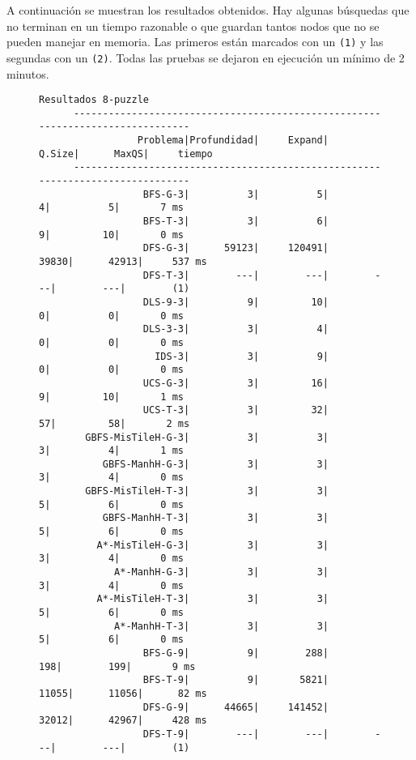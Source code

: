 \documentclass{article}
\begin{document}
A continuación se muestran los resultados obtenidos. Hay algunas búsquedas que no terminan en un tiempo razonable o que guardan tantos nodos que no se pueden manejar en memoria. Las primeros están marcados con un \texttt{(1)} y las segundas con un \texttt{(2)}. Todas las pruebas se dejaron en ejecución un mínimo de 2 minutos.
\newline
\begin{figure}[H]
\begin{Verbatim}[fontsize=\footnotesize]
      Resultados 8-puzzle
      -------------------------------------------------------------------------------
                 Problema|Profundidad|     Expand|     Q.Size|      MaxQS|     tiempo
      -------------------------------------------------------------------------------
                  BFS-G-3|          3|          5|          4|          5|       7 ms
                  BFS-T-3|          3|          6|          9|         10|       0 ms
                  DFS-G-3|      59123|     120491|      39830|      42913|     537 ms
                  DFS-T-3|        ---|        ---|        ---|        ---|        (1)
                  DLS-9-3|          9|         10|          0|          0|       0 ms
                  DLS-3-3|          3|          4|          0|          0|       0 ms
                    IDS-3|          3|          9|          0|          0|       0 ms
                  UCS-G-3|          3|         16|          9|         10|       1 ms
                  UCS-T-3|          3|         32|         57|         58|       2 ms
        GBFS-MisTileH-G-3|          3|          3|          3|          4|       1 ms
           GBFS-ManhH-G-3|          3|          3|          3|          4|       0 ms
        GBFS-MisTileH-T-3|          3|          3|          5|          6|       0 ms
           GBFS-ManhH-T-3|          3|          3|          5|          6|       0 ms
          A*-MisTileH-G-3|          3|          3|          3|          4|       0 ms
             A*-ManhH-G-3|          3|          3|          3|          4|       0 ms
          A*-MisTileH-T-3|          3|          3|          5|          6|       0 ms
             A*-ManhH-T-3|          3|          3|          5|          6|       0 ms
                  BFS-G-9|          9|        288|        198|        199|       9 ms
                  BFS-T-9|          9|       5821|      11055|      11056|      82 ms
                  DFS-G-9|      44665|     141452|      32012|      42967|     428 ms
                  DFS-T-9|        ---|        ---|        ---|        ---|        (1)

\end{Verbatim}
\end{figure}
\end{document}
